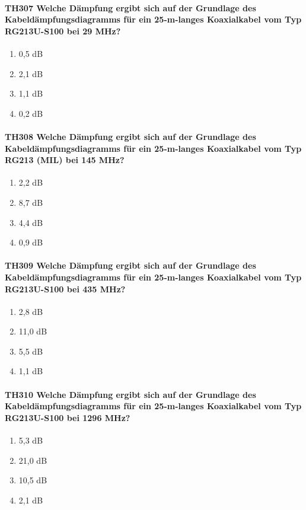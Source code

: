 \documentclass[8pt]{article}
\begin{document}
\paragraph*{TH307 Welche Dämpfung ergibt sich auf der Grundlage des Kabeldämpfungsdiagramms für ein 25-m-langes Koaxialkabel vom Typ RG213U-S100 bei 29 MHz?}
\begin{enumerate}[nolistsep,label=\Alph*]
\item 0,5 dB
\item 2,1 dB
\item 1,1 dB
\item 0,2 dB
\end{enumerate}

\paragraph*{TH308 Welche Dämpfung ergibt sich auf der Grundlage des Kabeldämpfungsdiagramms für ein 25-m-langes Koaxialkabel vom Typ RG213 (MIL) bei 145 MHz?}
\begin{enumerate}[nolistsep,label=\Alph*]
\item 2,2 dB
\item 8,7 dB
\item 4,4 dB
\item 0,9 dB
\end{enumerate}

\paragraph*{TH309 Welche Dämpfung ergibt sich auf der Grundlage des Kabeldämpfungsdiagramms für ein 25-m-langes Koaxialkabel vom Typ RG213U-S100 bei 435 MHz?}
\begin{enumerate}[nolistsep,label=\Alph*]
\item 2,8 dB
\item 11,0 dB
\item 5,5 dB
\item 1,1 dB
\end{enumerate}

\paragraph*{TH310 Welche Dämpfung ergibt sich auf der Grundlage des Kabeldämpfungsdiagramms für ein 25-m-langes Koaxialkabel vom Typ RG213U-S100 bei 1296 MHz?}
\begin{enumerate}[nolistsep,label=\Alph*]
\item 5,3 dB
\item 21,0 dB
\item 10,5 dB
\item 2,1 dB
\end{enumerate}
\end{document}
